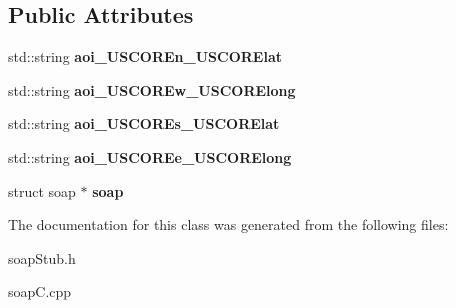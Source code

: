 \subsection*{Public Attributes}
\begin{DoxyCompactItemize}
\item 
\hypertarget{class__pass____AOI__USCORErectangle_acb69873e43e4d7a32b6d5a178c0591a1}{
std::string {\bfseries aoi\_\-USCOREn\_\-USCORElat}}
\label{class__pass____AOI__USCORErectangle_acb69873e43e4d7a32b6d5a178c0591a1}

\item 
\hypertarget{class__pass____AOI__USCORErectangle_a594cddf160557a8f4f56af7c35ef1cf5}{
std::string {\bfseries aoi\_\-USCOREw\_\-USCORElong}}
\label{class__pass____AOI__USCORErectangle_a594cddf160557a8f4f56af7c35ef1cf5}

\item 
\hypertarget{class__pass____AOI__USCORErectangle_a63d3c39763771bafce8d5fb4cec8e87e}{
std::string {\bfseries aoi\_\-USCOREs\_\-USCORElat}}
\label{class__pass____AOI__USCORErectangle_a63d3c39763771bafce8d5fb4cec8e87e}

\item 
\hypertarget{class__pass____AOI__USCORErectangle_ab75fc46f7c68cb40c08bad60b722eba8}{
std::string {\bfseries aoi\_\-USCOREe\_\-USCORElong}}
\label{class__pass____AOI__USCORErectangle_ab75fc46f7c68cb40c08bad60b722eba8}

\item 
\hypertarget{class__pass____AOI__USCORErectangle_aac6f0485f637770c2cf9560a068c3ab5}{
struct soap $\ast$ {\bfseries soap}}
\label{class__pass____AOI__USCORErectangle_aac6f0485f637770c2cf9560a068c3ab5}

\end{DoxyCompactItemize}


The documentation for this class was generated from the following files:\begin{DoxyCompactItemize}
\item 
soapStub.h\item 
soapC.cpp\end{DoxyCompactItemize}
